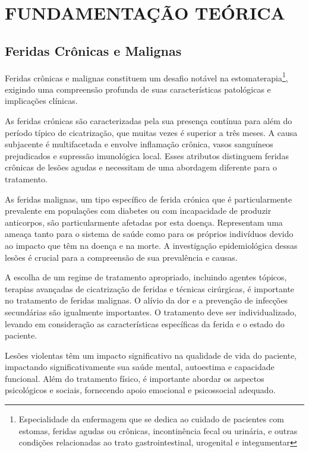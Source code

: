 \section{FUNDAMENTAÇÃO TEÓRICA}

\subsection{Feridas Crônicas e Malignas}

Feridas crônicas e malignas constituem um desafio notável na estomaterapia\footnote{Especialidade da enfermagem que se dedica ao cuidado de pacientes com estomas, feridas agudas ou crônicas, incontinência fecal ou urinária, e outras condições relacionadas ao trato gastrointestinal, urogenital e integumentar}, exigindo uma compreensão profunda de suas características patológicas e implicações clínicas.

As feridas crónicas são caracterizadas pela sua presença contínua para além do período típico de cicatrização, que muitas vezes é superior a três meses. A causa subjacente é multifacetada e envolve inflamação crônica, vasos sanguíneos prejudicados e supressão imunológica local. Esses atributos distinguem feridas crônicas de lesões agudas e necessitam de uma abordagem diferente para o tratamento.

As feridas malignas, um tipo específico de ferida crónica que é particularmente prevalente em populações com diabetes ou com incapacidade de produzir anticorpos, são particularmente afetadas por esta doença. Representam uma ameaça tanto para o sistema de saúde como para os próprios indivíduos devido ao impacto que têm na doença e na morte. A investigação epidemiológica dessas lesões é crucial para a compreensão de sua prevalência e causas.

A escolha de um regime de tratamento apropriado, incluindo agentes tópicos, terapias avançadas de cicatrização de feridas e técnicas cirúrgicas, é importante no tratamento de feridas malignas. O alívio da dor e a prevenção de infecções secundárias são igualmente importantes. O tratamento deve ser individualizado, levando em consideração as características específicas da ferida e o estado do paciente.

Lesões violentas têm um impacto significativo na qualidade de vida do paciente, impactando significativamente sua saúde mental, autoestima e capacidade funcional. Além do tratamento físico, é importante abordar os aspectos psicológicos e sociais, fornecendo apoio emocional e psicossocial adequado.

